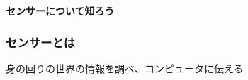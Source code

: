 \begin{frame}[plain]
    \begin{center}
        \vspace{48pt}
        {\huge\bf センサーについて知ろう}
    \end{center}
\end{frame}

\begin{frame}[fragile]
    \frametitle{センサーとは}
    \begin{center}
        \begin{description}
            \item 身の回りの世界の情報を調べ、コンピュータに伝える
        \end{description}
        \vspace{12pt}
        
    \end{center}
\end{frame}

